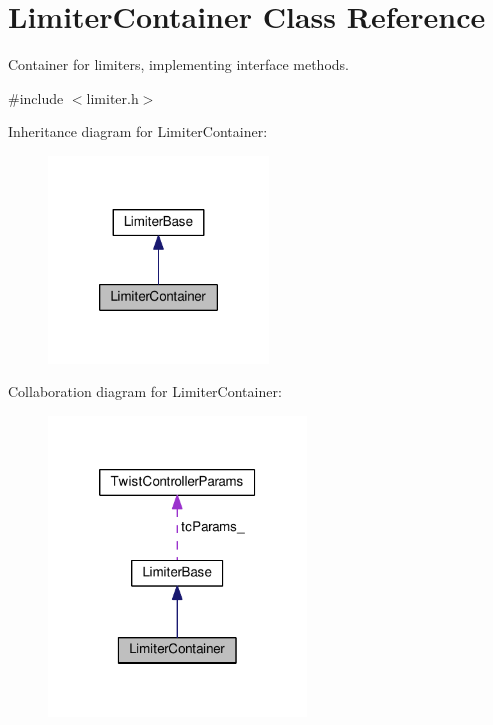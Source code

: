 \hypertarget{classLimiterContainer}{\section{Limiter\-Container Class Reference}
\label{classLimiterContainer}
}


Container for limiters, implementing interface methods.  




{\ttfamily \#include $<$limiter.\-h$>$}



Inheritance diagram for Limiter\-Container\-:
\nopagebreak
\begin{figure}[H]
\begin{center}
\leavevmode
\includegraphics[width=166pt]{classLimiterContainer__inherit__graph}
\end{center}
\end{figure}


Collaboration diagram for Limiter\-Container\-:
\nopagebreak
\begin{figure}[H]
\begin{center}
\leavevmode
\includegraphics[width=194pt]{classLimiterContainer__coll__graph}
\end{center}
\end{figure}
